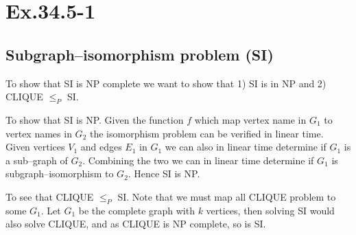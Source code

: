 \section*{Ex.34.5-1}
\subsection*{Subgraph--isomorphism problem (SI)}


To show that SI is NP complete we want to show that 1) SI is in NP and 2) CLIQUE $\leq_P$ SI.

To show that SI is NP. Given the function $f$ which map vertex name in $G_1$ to vertex names in $G_2$ the isomorphism problem can be verified in linear time. Given vertices $V_1$ and edges $E_1$ in $G_1$ we can also in linear time determine if $G_1$ is a sub--graph of $G_2$. Combining the two we can in linear time determine if $G_1$ is subgraph--isomorphism to $G_2$. Hence SI is NP.

To see that CLIQUE $\leq_P$ SI. Note that we must map all CLIQUE problem to some $G_1$. Let $G_1$ be the complete graph with $k$ vertices, then solving SI would also solve CLIQUE, and as CLIQUE is NP complete, so is SI.